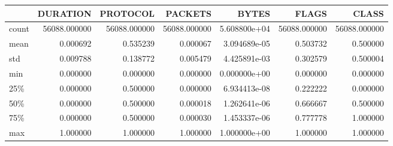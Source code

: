\begin{tabular}{lrrrrrr}
\toprule
{} &      DURATION &      PROTOCOL &       PACKETS &         BYTES &         FLAGS &         CLASS \\
\midrule
count &  56088.000000 &  56088.000000 &  56088.000000 &  5.608800e+04 &  56088.000000 &  56088.000000 \\
mean  &      0.000692 &      0.535239 &      0.000067 &  3.094689e-05 &      0.503732 &      0.500000 \\
std   &      0.009788 &      0.138772 &      0.005479 &  4.425891e-03 &      0.302579 &      0.500004 \\
min   &      0.000000 &      0.000000 &      0.000000 &  0.000000e+00 &      0.000000 &      0.000000 \\
25\%   &      0.000000 &      0.500000 &      0.000000 &  6.934413e-08 &      0.222222 &      0.000000 \\
50\%   &      0.000000 &      0.500000 &      0.000018 &  1.262641e-06 &      0.666667 &      0.500000 \\
75\%   &      0.000000 &      0.500000 &      0.000030 &  1.453337e-06 &      0.777778 &      1.000000 \\
max   &      1.000000 &      1.000000 &      1.000000 &  1.000000e+00 &      1.000000 &      1.000000 \\
\bottomrule
\end{tabular}
